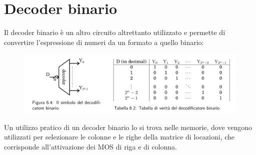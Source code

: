\documentclass{book}
\begin{document}
    \section{Decoder binario}
        Il decoder binario è un altro circuito altrettanto utilizzato e permette di convertire l'espressione di numeri da un formato a quello binario:
        \begin{figure}[h!]
            \centering
            \includegraphics[width=0.75\linewidth]{img/chap6img2.png}
        \end{figure}
        Un utilizzo pratico di un decoder binario lo si trova nelle memorie, dove vengono utilizzati per selezionare le colonne e le righe della matrice di locazioni, che corrisponde all'attivazione dei MOS di riga e di colonna.
\end{document}
